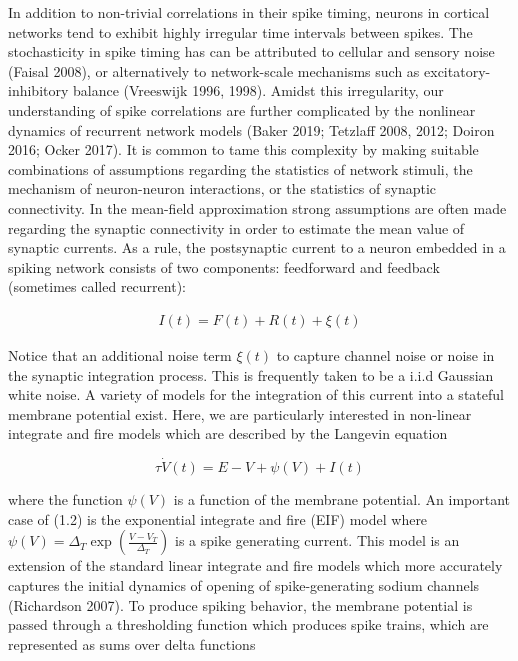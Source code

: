 \documentclass{ucetd}
\begin{document}
In addition to non-trivial correlations in their spike timing, neurons in cortical networks tend to exhibit highly irregular time intervals between spikes. The stochasticity in spike timing has can be attributed to cellular and sensory noise (Faisal 2008), or alternatively to network-scale mechanisms such as excitatory-inhibitory balance (Vreeswijk 1996, 1998). Amidst this irregularity, our understanding of spike correlations are further complicated by the nonlinear dynamics of recurrent network models (Baker 2019; Tetzlaff 2008, 2012; Doiron 2016; Ocker 2017). It is common to tame this complexity by making suitable combinations of assumptions regarding the statistics of network stimuli, the mechanism of neuron-neuron interactions, or the statistics of synaptic connectivity. In the mean-field approximation strong assumptions are often made regarding the synaptic connectivity in order to estimate the mean value of synaptic currents. As a rule, the postsynaptic current to a neuron embedded in a spiking network consists of two components: feedforward and feedback (sometimes called recurrent):

\begin{align}
I(t) = F(t) + R(t) + \xi(t)
\end{align}

Notice that an additional noise term $\xi(t)$ to capture channel noise or noise in the synaptic integration process. This is frequently taken to be a i.i.d Gaussian white noise. A variety of models for the integration of this current into a stateful membrane potential exist. Here, we are particularly interested in non-linear integrate and fire models which are described by the Langevin equation

\begin{equation}
\tau\dot{V}(t) = E - V + \psi(V) + I(t)
\end{equation}

where the function $\psi(V)$ is a function of the membrane potential. An important case of (1.2) is the exponential integrate and fire (EIF) model where $\psi(V) = \Delta_{T}\exp\left(\frac{V-V_{T}}{\Delta_{T}}\right)$ is a spike generating current. This model is an extension of the standard linear integrate and fire models which more accurately captures the initial dynamics of opening of spike-generating sodium channels (Richardson 2007). To produce spiking behavior, the membrane potential is passed through a thresholding function which produces spike trains, which are represented as sums over delta functions
\end{document}
